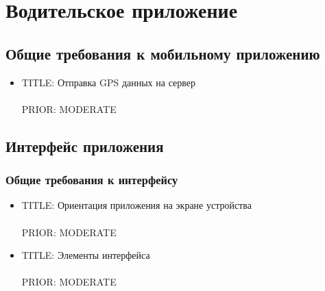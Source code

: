 \section{Водительское приложение}

  \subsection{Общие требования к мобильному приложению}

    \begin{itemize}

      \item{
        TITLE: Отправка GPS данных на сервер\\
        \\
        PRIOR: MODERATE\\}

    \end{itemize}

  \subsection{Интерфейс приложения}
   
    \subsubsection{Общие требования к интерфейсу}
      \begin{itemize}

        \item{
          TITLE: Ориентация приложения на экране устройства\\
          \\
          PRIOR: MODERATE\\}

        \item{
          TITLE: Элементы интерфейса\\
          \\
          PRIOR: MODERATE\\}

      \end{itemize}

